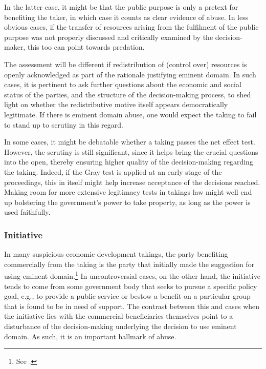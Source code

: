 In the latter case, it might be that the public purpose is only a pretext for benefiting the taker, in which case it counts as clear evidence of abuse. In less obvious cases, if the transfer of resources arising from the fulfilment of the public purpose was not properly discussed and critically examined by the decision-maker, this too can point towards predation.

The assessment will be different if redistribution of (control over) resources is openly acknowledged as part of the rationale justifying eminent domain. In such cases, it is pertinent to ask further  questions about the economic and social status of the parties, and the structure of the decision-making process, to shed light on whether the redistributive motive itself appears democratically legitimate. If there is eminent domain abuse, one would expect the taking to fail to stand up to scrutiny in this regard.

In some cases, it might be debatable whether a taking passes the net effect test. However, the scrutiny is still significant, since it helps bring the crucial questions into the open, thereby ensuring higher quality of the decision-making regarding the taking. Indeed, if the Gray test is applied at an early stage of the proceedings, this in itself might help increase acceptance of the decisions reached. Making room for more extensive legitimacy tests in takings law might well end up bolstering the government's power to take property, as long as the power is used faithfully.

\subsubsection*{Initiative}

In many suspicious economic development takings, the party benefiting commercially from the taking is the party that initially made the suggestion for using eminent domain.\footnote{See \cite[32]{gray11}.} In uncontroversial cases, on the other hand, the initiative tends to come from some government body that seeks to pursue a specific policy goal, e.g., to provide a public service or bestow a benefit on a particular group that is found to be in need of support. The contrast between this and cases when the initiative lies with the commercial beneficiaries themselves point to a disturbance of the decision-making underlying the decision to use eminent domain. As such, it is an important hallmark of abuse.

